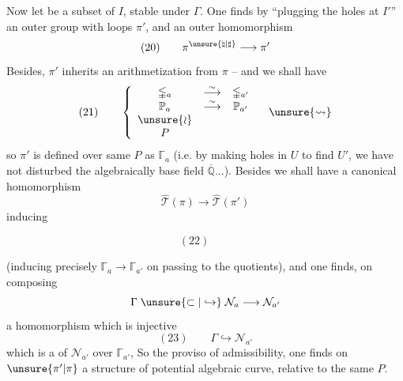 Now let
be a
subset of $I$, stable under $\Gamma$. One finds
by ``plugging the holes at $I'$'' an
outer group with loops $\pi'$,  and an
outer homomorphism
\[
(20)\qquad \pi^{\unsure{\natural|\sharp}}\longrightarrow\pi'
\]
Besides, $\pi'$ inherits an arithmetization 
from $\pi$ -- and we shall have
\[
(21)\qquad
\left\{
\begin{array}{ccc}
\mathbb{\Gamma}_a & \overset{\sim}{\longrightarrow} & \mathbb{\Gamma}_{a'} \\
\mathbb P_a & \overset{\sim}{\longrightarrow} & \mathbb P_{a'} \\
\unsure{\wr} & & \\
P & &
\end{array}
\right.
\quad\unsure{\leadsto}
\]
so $\pi'$ is defined over  same $P$ as
$\mathbb{\Gamma}_a$
(i.e. by making holes in $U$ to
find $U'$, we have not disturbed the
algebraically  base field $\overline{\mathbb Q}\ldots$). Besides
we shall have a canonical homomorphism
\[
\widehat{\mathcal T}(\pi)\longrightarrow
\widehat{\mathcal T}(\pi')
\]
inducing
\begin{samepage}
\[
(22)\qquad
\]
\end{samepage}



(inducing precisely $\mathbb{\Gamma}_a\longrightarrow\mathbb{\Gamma}_{a'}$ on passing
to the quotients), and one finds, on
composing
\[
\Gamma\;\unsure{\subset|\hookrightarrow}\;\mathcal N_a\longrightarrow\mathcal N_{a'}
\]
a homomorphism which is  injective
\[
(23)\qquad\Gamma\hookrightarrow\mathcal N_{a'}
\]
which is a  of $\mathcal N_{a'}$ over $\mathbb{\Gamma}_{a'}$,
So  the proviso of admissibility,
one finds on  $\unsure{\pi'|\pi}$ a structure
of potential algebraic curve, relative
to the same $P$.

